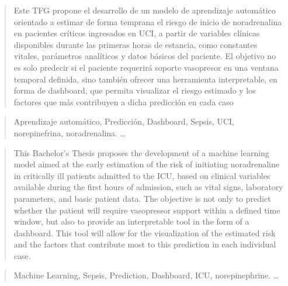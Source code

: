 \documentclass[a4paper,12pt,twoside]{memoir}
\begin{document}
\vfill



\newpage\null\thispagestyle{empty}\newpage




\frontmatter

\renewcommand*\abstractname{Resumen}
\begin{abstract}
Este TFG propone el desarrollo de un modelo de aprendizaje automático orientado a estimar de forma temprana el riesgo de inicio de noradrenalina en pacientes críticos ingresados en UCI, a partir de variables clínicas disponibles durante las primeras horas de estancia, como constantes vitales, parámetros analíticos y datos básicos del paciente. El objetivo no es solo predecir si el paciente requerirá soporte vasopresor en una ventana temporal definida, sino también ofrecer una herramienta interpretable, en forma de dashboard, que permita visualizar el riesgo estimado y los factores que más contribuyen a dicha predicción en cada caso
\end{abstract}

\renewcommand*\abstractname{Descriptores}
\begin{abstract}
Aprendizaje automático, Predicción, Dashboard, Sepsis, UCI, norepinefrina, noradrenalina. \ldots
\end{abstract}

\clearpage

\renewcommand*\abstractname{Abstract}
\begin{abstract}
This Bachelor's Thesis proposes the development of a machine learning model aimed at the early estimation of the risk of initiating noradrenaline in critically ill patients admitted to the ICU, based on clinical variables available during the first hours of admission, such as vital signs, laboratory parameters, and basic patient data. The objective is not only to predict whether the patient will require vasopressor support within a defined time window, but also to provide an interpretable tool in the form of a dashboard. This tool will allow for the visualization of the estimated risk and the factors that contribute most to this prediction in each individual case.
\end{abstract}

\renewcommand*\abstractname{Keywords}
\begin{abstract}
Machine Learning, Sepsis, Prediction, Dashboard, ICU, norepinephrine. \ldots
\end{abstract}
\end{document}
